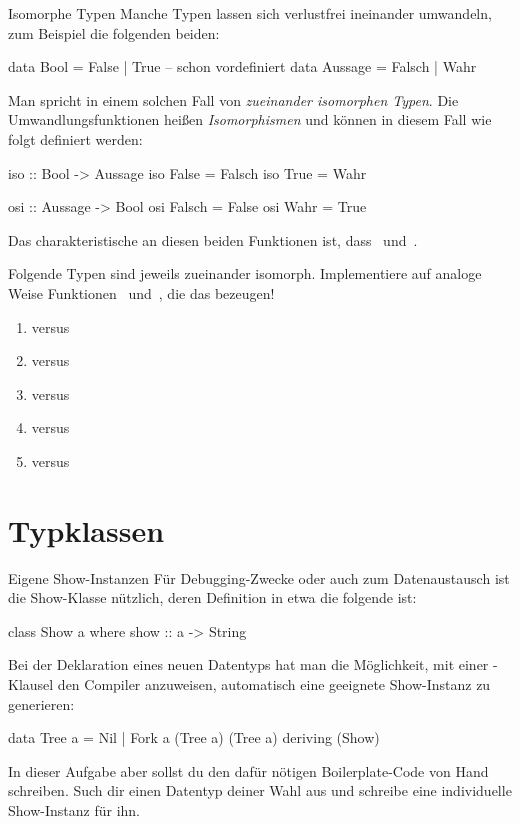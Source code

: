 \documentclass{uebblatt}
\begin{document}
\begin{aufgabe}{Isomorphe Typen}
Manche Typen lassen sich verlustfrei ineinander umwandeln, zum Beispiel die
folgenden beiden:
\begin{haskellcode}
data Bool    = False  | True  -- schon vordefiniert
data Aussage = Falsch | Wahr
\end{haskellcode}
Man spricht in einem solchen Fall von \emph{zueinander isomorphen Typen}. Die
Umwandlungsfunktionen heißen \emph{Isomorphismen} und können in diesem Fall wie
folgt definiert werden:
\begin{haskellcode}
iso :: Bool -> Aussage
iso False = Falsch
iso True  = Wahr

osi :: Aussage -> Bool
osi Falsch = False
osi Wahr   = True
\end{haskellcode}
Das charakteristische an diesen beiden Funktionen ist, dass~ und~.

Folgende Typen sind jeweils zueinander isomorph. Implementiere
auf analoge Weise Funktionen~ und~, die
das bezeugen!
\begin{enumerate}
\item {}          versus 
\item {}     versus 
\item {} versus 
\item {}     versus 
\item {}     versus 
\end{enumerate}
\end{aufgabe}


\section{Typklassen}








\begin{aufgabe}{Eigene Show-Instanzen}
Für Debugging-Zwecke oder auch zum Datenaustausch ist die Show-Klasse nützlich,
deren Definition in etwa die folgende ist:
\begin{haskellcode}
class Show a where
    show :: a -> String
\end{haskellcode}
Bei der Deklaration eines neuen Datentyps hat man die Möglichkeit, mit einer
-Klausel den Compiler anzuweisen, automatisch eine
geeignete Show-Instanz zu generieren:
\begin{haskellcode}
data Tree a = Nil | Fork a (Tree a) (Tree a)
    deriving (Show)
\end{haskellcode}
In dieser Aufgabe aber sollst du den dafür nötigen Boilerplate-Code von Hand
schreiben. Such dir einen Datentyp deiner Wahl aus und schreibe eine
individuelle Show-Instanz für ihn.
\end{aufgabe}
\end{document}
